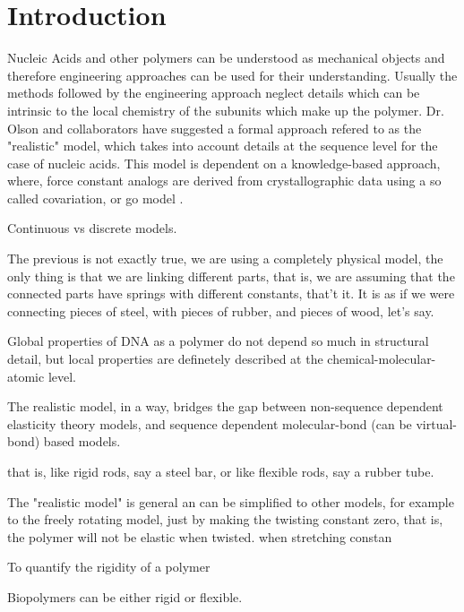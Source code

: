 \part{Introduction}

Nucleic Acids and other polymers can be understood as mechanical
objects \cite{marko2003, nelson2004} and therefore engineering
approaches can be used for their understanding. Usually the methods
followed by the engineering approach neglect details which can be
intrinsic to the local chemistry of the subunits which make up the
polymer. Dr. Olson and collaborators have suggested a formal approach
refered to as the "realistic" model, which takes into account details
at the sequence level for the case of nucleic acids. This model is
dependent on a knowledge-based approach, where, force constant analogs
are derived from crystallographic data using a so called covariation,
or go model \cite{go1974}.





Continuous vs discrete models.





The previous is not exactly true, we are using a completely physical
model, the only thing is that we are linking different parts, that is,
we are assuming that the connected parts have springs with different
constants, that't it. It is as if we were connecting pieces of steel,
with pieces of rubber, and pieces of wood, let's say.

Global properties of DNA as a polymer do not depend so much in
structural detail, but local properties are definetely described at
the chemical-molecular-atomic level.

The realistic model, in a way, bridges the gap between non-sequence
dependent elasticity theory models, and sequence dependent
molecular-bond (can be virtual-bond) based models.


that is, like rigid rods, say a steel bar, or like flexible rods, say
a rubber tube.

The "realistic model" is general an can be simplified to other models,
for example to the freely rotating model, just by making the twisting
constant zero, that is, the polymer will not be elastic when twisted.
when stretching constan 



To quantify the rigidity of a polymer

Biopolymers can be either rigid or flexible. 

